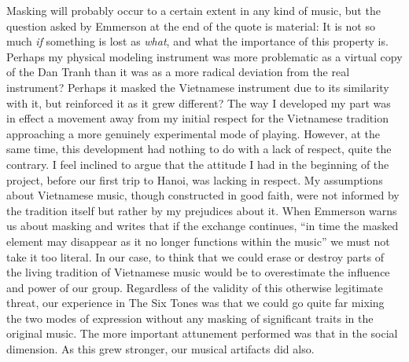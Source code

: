 \documentclass[a4paper]{article}
\begin{document}
Masking will probably occur to a certain extent in any kind of music, but the question asked by Emmerson at the end of the quote is material: It is not so much \emph{if} something is lost as \emph{what}, and what the importance of this property is. Perhaps my physical modeling instrument was more problematic as a virtual copy of the Dan Tranh than it was as a more radical deviation from the real instrument? Perhaps it masked the Vietnamese instrument due to its similarity with it, but reinforced it as it grew different? 
The way I developed my part was in effect a movement away from my initial respect for the Vietnamese tradition approaching a more genuinely experimental mode of playing. However, at the same time, this development had nothing to do with a lack of respect, quite the contrary. I feel inclined to argue that the attitude I had in the beginning of the project, before our first trip to Hanoi, was lacking in respect. My assumptions about Vietnamese music, though constructed in good faith, were not informed by the tradition itself but rather by my prejudices about it.
When Emmerson warns us about masking and writes that if the exchange continues, ``in time the masked element may disappear as it no longer functions within the music'' we must not take it too literal. In our case, to think that we could erase or destroy parts of the living tradition of Vietnamese music would be to overestimate the influence and power of our group. Regardless of the validity of this otherwise legitimate threat, our experience  in The Six Tones was that we could go quite far mixing the two modes of expression without any masking of significant traits in the original music. The more important attunement performed was that in the social dimension. As this grew stronger, our musical artifacts did also.
\end{document}
